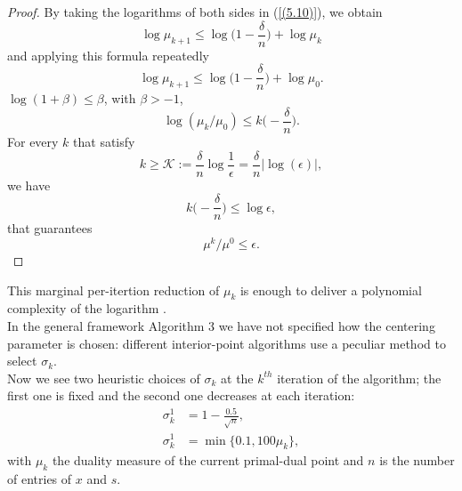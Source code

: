 \documentclass[a4paper,10 pt,titlepage,twoside]{book}
\theoremstyle{plain}
\theoremstyle{definition}
\theoremstyle{remark}
\begin{document}
\begin{proof}
	By taking the logarithms of both sides in (\ref{(5.10)}), we obtain
	\begin{equation*}
	\log\mu_{k+1}\leq \log \bigg(1-\frac{\delta}{n}\bigg)+\log\mu_{k}\end{equation*}
	and applying this formula repeatedly
	\begin{equation*}
	\log\mu_{k+1}\leq \log \bigg(1-\frac{\delta}{n}\bigg)+\log\mu_{0}.
	\end{equation*}
	 $\log(1+\beta)\leq\beta$, with $\beta>-1$,\\
	\begin{equation*}
	\log(\mu_{k}/\mu_{0})\leq k\bigg(-\frac{\delta}{n}\bigg).
	\end{equation*}	
	For every $k$ that satisfy
	\begin{equation*}
	k\geq\mathcal{K}:= \frac{\delta}{n}\log\frac{1}{\epsilon} = \frac{\delta}{n}|\log(\epsilon)|,
	\end{equation*}
	we have 
	\begin{equation*}
	k\bigg(-\frac{\delta}{n}\bigg)\leq\log\epsilon,
	\end{equation*}	
	that guarantees
	\begin{equation*}
	\mu^{k}/\mu^{0}\leq\epsilon.
	\end{equation*}	
\end{proof}
This marginal per-itertion reduction of $\mu_{k}$ is enough to deliver a polynomial complexity of the logarithm \cite{25y}.\\
In the general framework Algorithm 3 we have not specified how the centering parameter is chosen: different interior-point algorithms use a peculiar method to select $\sigma_{k}$.\\
Now we see two heuristic choices of $\sigma_{k}$ at the $k^{th}$ iteration of the algorithm; the first one is fixed and the second one decreases at each iteration: 
\begin{align}
\sigma^{1}_{k} &= 1 -\frac{0.5}{\sqrt{n}},\tag{4.13a}\label{LPF1}\\
\sigma^{1}_{k} &= \min\{0.1, 100\mu_{k} \},\label{LPF2}\tag{4.13b}
\end{align}
with $\mu_{k}$ the duality measure of the current primal-dual point and $n$ is the number of entries of $x$ and $s$. 
\end{document}
